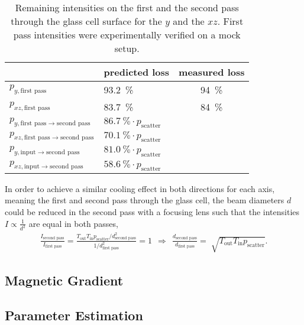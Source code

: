 \begin{table}
    \centering
    \begin{tabular}{llc}
        \toprule
        & predicted loss & measured loss \\
        \midrule
        $p_{y, \text{first pass}}$ & \SI{93.2}{\percent} & \SI{94}{\percent} \\
        $p_{xz, \text{first pass}}$ & \SI{83.7}{\percent} & \SI{84}{\percent} \\
        $p_{y, \text{first pass} \rightarrow \text{second pass}}$ & $\SI{86.7}{\percent} \cdot p_\text{scatter}$ & \\
        $p_{xz, \text{first pass} \rightarrow \text{second pass}}$ & $\SI{70.1}{\percent} \cdot p_\text{scatter}$ & \\
        $p_{y, \text{input} \rightarrow \text{second pass}}$ & $\SI{81.0}{\percent} \cdot p_\text{scatter}$ & \\
        $p_{xz, \text{input} \rightarrow \text{second pass}}$ & $\SI{58.6}{\percent} \cdot p_\text{scatter}$ & \\
        \bottomrule
    \end{tabular}
    \caption{Remaining intensities on the first and the second pass through the glass cell surface for the $y$ and the $xz$. First pass intensities were experimentally verified on a mock setup.}
    \label{tab:intensity_losses}
\end{table}

In order to achieve a similar cooling effect in both directions for each axis, meaning the first and second pass through the glass cell, the beam diameters $d$ could be reduced in the second pass with a focusing lens such that the intensities $I \propto \frac{1}{d^2}$ are equal in both passes,
\begin{align}
\frac{I_\text{second pass}}{I_\text{first pass}} =  \frac{T_\text{out} T_\text{in} p_\text{scatter} / d^2_\text{second pass}}{1/ d^2_\text{first pass}} = 1 ~~\Rightarrow~~ \frac{d_\text{second pass}}{d_\text{first pass}} = \sqrt[]{T_\text{out} T_\text{in} p_\text{scatter}}.
\end{align}


\subsection*{Magnetic Gradient}

\subsection*{Parameter Estimation}
